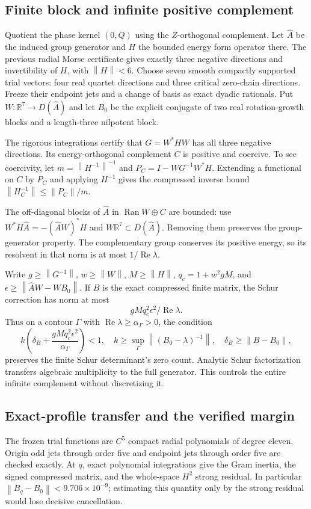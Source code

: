 \documentclass[11pt,a4paper]{article}
\theoremstyle{remark}\newtheorem{remark}[theorem]{Remark}
\newcommand{\R}{\mathbb R}\newcommand{\C}{\mathbb C}
\newcommand{\norm}[1]{\left\|#1\right\|}
\newcommand{\Rea}{\operatorname{Re}}\newcommand{\Ima}{\operatorname{Im}}
\begin{document}
\subsection{Finite block and infinite positive complement}
Quotient the phase kernel $(0,Q)$ using the $Z$-orthogonal complement. Let $\widehat A$ be the induced group generator and $H$ the bounded energy form operator there. The previous radial Morse certificate gives exactly three negative directions and invertibility of $H$, with $\norm H<6$. Choose seven smooth compactly supported trial vectors: four real quartet directions and three critical zero-chain directions. Freeze their endpoint jets and a change of basis as exact dyadic rationals. Put $W:\R^7\to D(\widehat A)$ and let $B_0$ be the explicit conjugate of two real rotation-growth blocks and a length-three nilpotent block.

The rigorous integrations certify that $G=W^*HW$ has all three negative directions. Its energy-orthogonal complement $C$ is positive and coercive. To see coercivity, let $m=\norm{H^{-1}}^{-1}$ and $P_C=I-WG^{-1}W^*H$. Extending a functional on $C$ by $P_C$ and applying $H^{-1}$ gives the compressed inverse bound $\norm{H_C^{-1}}\le\norm{P_C}/m$.

The off-diagonal blocks of $\widehat A$ in $\operatorname{Ran}W\oplus C$ are bounded: use $W^*H\widehat A=-(\widehat AW)^*H$ and $W\R^7\subset D(\widehat A)$. Removing them preserves the group-generator property. The complementary group conserves its positive energy, so its resolvent in that norm is at most $1/\Rea\lambda$.

Write $g\ge\norm{G^{-1}}$, $w\ge\norm W$, $M\ge\norm H$, $q_c=1+w^2gM$, and $\epsilon\ge\norm{\widehat AW-WB_0}$. If $B$ is the exact compressed finite matrix, the Schur correction has norm at most
\[
 gM q_c^2\epsilon^2/\Rea\lambda.
\]
Thus on a contour $\Gamma$ with $\Rea\lambda\ge\alpha_\Gamma>0$, the condition
\begin{equation}\label{eq:rouche}
 k\left(\delta_B+\frac{gM q_c^2\epsilon^2}{\alpha_\Gamma}\right)<1,
 \quad k\ge\sup_\Gamma\norm{(B_0-\lambda)^{-1}},\quad
 \delta_B\ge\norm{B-B_0},
\end{equation}
preserves the finite Schur determinant's zero count. Analytic Schur factorization transfers algebraic multiplicity to the full generator. This controls the entire infinite complement without discretizing it.

\subsection{Exact-profile transfer and the verified margin}
The frozen trial functions are $C^5$ compact radial polynomials of degree eleven. Origin odd jets through order five and endpoint jets through order five are checked exactly. At $q$, exact polynomial integrations give the Gram inertia, the signed compressed matrix, and the whole-space $H^2$ strong residual. In particular $\norm{B_q-B_0}<9.706\times10^{-9}$; estimating this quantity only by the strong residual would lose decisive cancellation.
\end{document}
